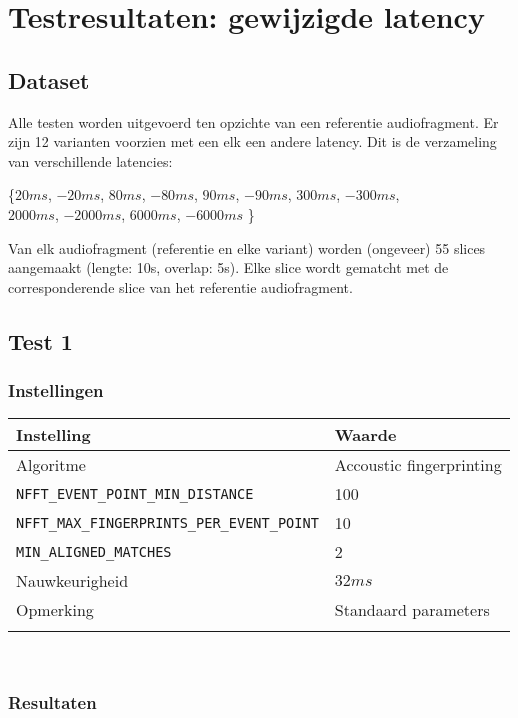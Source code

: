 \chapter{Testresultaten: gewijzigde latency}
\label{appendix-c}

\section*{Dataset}

Alle testen worden uitgevoerd ten opzichte van een referentie audiofragment. Er zijn 12 varianten voorzien met een elk een andere latency. Dit is de verzameling van verschillende latencies:
\begin{center}
	\{$20ms$, $-20ms$, $80ms$, $-80ms$, $90ms$, $-90ms$, $300ms$, $-300ms$, \\$2000ms$, $-2000ms$, $6000ms$, $-6000ms$ \}
\end{center}

Van elk audiofragment (referentie en elke variant) worden (ongeveer) 55 slices aangemaakt (lengte: 10s, overlap: 5s). Elke slice wordt gematcht met de corresponderende slice van het referentie audiofragment.

\section*{Test 1}

\subsection*{Instellingen}

\begin{tabular}{ l  l}
	\hline
	\textbf{Instelling} & \textbf{Waarde} \\
	\hline
	Algoritme & Accoustic fingerprinting \\
	\texttt{NFFT\_EVENT\_POINT\_MIN\_DISTANCE} & 100 \\
	\texttt{NFFT\_MAX\_FINGERPRINTS\_PER\_EVENT\_POINT} & 10 \\
	\texttt{MIN\_ALIGNED\_MATCHES} & 2 \\
	Nauwkeurigheid & $32ms$ \\
	Opmerking & Standaard parameters \\
	\\
\end{tabular}\\

\subsection*{Resultaten}

